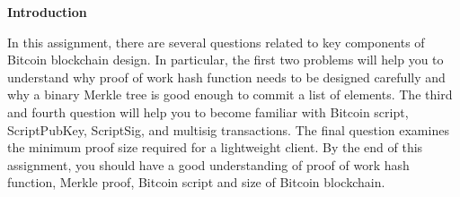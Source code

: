 \documentclass[11pt]{article}
\begin{document}
\vspace{0.2cm}
\newpage
\sloppy
{\bf Introduction} 
\vspace{0.2cm}

In this assignment, there are several questions related to key components of Bitcoin blockchain design. In particular, the first two problems will help you to understand why proof of work hash function needs to be designed carefully and why a binary Merkle tree is good enough to commit a list of elements. The third and fourth question will help you to become familiar with Bitcoin script, ScriptPubKey, ScriptSig, and multisig transactions. The final question examines the minimum proof size required for a lightweight client. By the end of this assignment, you should have a good understanding of proof of work hash function, Merkle proof, Bitcoin script and size of Bitcoin blockchain.


\vspace{0.2cm}
\end{document}

